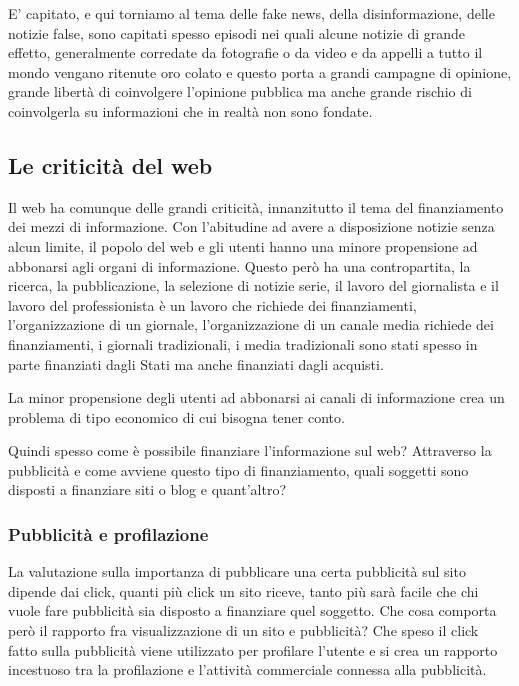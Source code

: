 E' capitato, e qui torniamo al tema delle fake news, della disinformazione, delle notizie false, sono capitati spesso episodi nei quali alcune notizie di grande effetto, generalmente corredate da fotografie o da video e da appelli a tutto il mondo vengano ritenute oro colato e questo porta a grandi campagne di opinione, grande libertà di coinvolgere l'opinione pubblica ma anche grande rischio di coinvolgerla su informazioni che in realtà non sono fondate. 

\subsection{Le criticità del web}

Il web ha comunque delle grandi criticità, innanzitutto il tema del finanziamento dei mezzi di informazione. 
Con l'abitudine ad avere a disposizione notizie senza alcun limite, il popolo del web e gli utenti hanno una minore propensione ad abbonarsi agli organi di informazione. Questo però ha una contropartita, la ricerca, la pubblicazione, la selezione di notizie serie, il lavoro del giornalista e il lavoro del professionista è un lavoro che richiede dei finanziamenti, l'organizzazione di un giornale, l'organizzazione di un canale media richiede dei finanziamenti, i giornali tradizionali, i media tradizionali sono stati spesso in parte finanziati dagli Stati ma anche finanziati dagli acquisti.

La minor propensione degli utenti ad abbonarsi ai canali di informazione crea un problema di tipo economico di cui bisogna tener conto. 

Quindi spesso come è possibile finanziare l'informazione sul web? Attraverso la pubblicità e come avviene questo tipo di finanziamento, quali soggetti sono disposti a finanziare siti o blog e quant'altro?

\subsubsection{Pubblicità e profilazione}
La valutazione sulla importanza di pubblicare una certa pubblicità sul sito dipende dai click, quanti più click un sito riceve, tanto più sarà facile che chi vuole fare pubblicità sia disposto a finanziare quel soggetto. 
Che cosa comporta però il rapporto fra visualizzazione di un sito e pubblicità? Che speso il click fatto sulla pubblicità viene utilizzato per profilare l'utente e si crea un rapporto incestuoso tra la profilazione e l'attività commerciale connessa alla pubblicità. 
